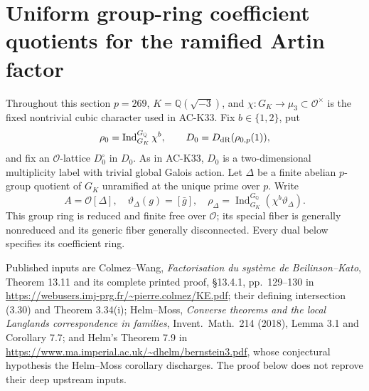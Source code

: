 \section{Uniform group-ring coefficient quotients for the ramified Artin factor}
\label{sec:ray-coefficient}

Throughout this section \(p=269\), \(K=\mathbb Q(\sqrt{-3})\), and
\(\chi:G_K\to\mu _3\subset\mathcal O^\times\) is the fixed nontrivial cubic
character used in AC-K33. Fix \(b\in\{1,2\}\), put
\[
 \rho_0=\operatorname{Ind}_{G_K}^{G_{\mathbb Q}}\chi^b,\qquad
 D_0=D_{\rm dR}(\rho_{0,p}(1)),
\]
and fix an \(\mathcal O\)-lattice \(D_0^\circ\) in \(D_0\).
As in AC-K33, \(D_0\) is a two-dimensional multiplicity label with
trivial global Galois action. Let \(\Delta\) be a finite abelian
\(p\)-group quotient of \(G_K\) unramified at the unique prime over \(p\).
Write
\[
 A=\mathcal O[\Delta],\quad\vartheta_\Delta(g)=[\bar g],\quad
 \rho_\Delta=\operatorname{Ind}_{G_K}^{G_{\mathbb Q}}
                    (\chi^b\vartheta_\Delta).
 \tag{RCQ.1}
\]
This group ring is reduced and finite free over \(\mathcal O\); its
special fiber is generally nonreduced and its generic fiber generally
disconnected. Every dual below specifies its coefficient ring.

Published inputs are Colmez--Wang, \emph{Factorisation du syst\`eme de
Beilinson--Kato}, Theorem 13.11 and its complete printed proof,
\S13.4.1, pp.~129--130 in
\url{https://webusers.imj-prg.fr/~pierre.colmez/KE.pdf};
their defining intersection (3.30) and Theorem 3.34(i);
Helm--Moss, \emph{Converse theorems and the local Langlands
correspondence in families}, Invent.\ Math.\ 214 (2018), Lemma 3.1
and Corollary 7.7; and Helm's Theorem 7.9 in
\url{https://www.ma.imperial.ac.uk/~dhelm/bernstein3.pdf},
whose conjectural hypothesis the Helm--Moss corollary discharges.
The proof below does not reprove their deep upstream inputs.

